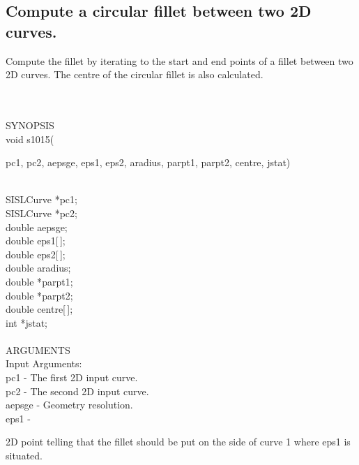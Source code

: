 \subsection{Compute a circular fillet between two 2D curves.}
\begin{minipg1}
  Compute the fillet by iterating to the start and end points of a
  fillet between two 2D curves. The centre of the circular fillet is
  also calculated.
\end{minipg1} \\ \\
SYNOPSIS\\
        \>void s1015(\begin{minipg3}
          {\fov pc1}, {\fov pc2}, {\fov aepsge}, {\fov eps1}, {\fov eps2}, {\fov aradius}, {\fov parpt1}, {\fov parpt2},
          {\fov centre}, {\fov jstat})
        \end{minipg3}\\[0.3ex]
                \>\>    SISLCurve  \>  *{\fov pc1};\\
                \>\>    SISLCurve  \>  *{\fov pc2};\\
                \>\>    double     \>  {\fov aepsge};\\
                \>\>    double     \>  {\fov eps1}[\,];\\
                \>\>    double     \>  {\fov eps2}[\,];\\
                \>\>    double     \>  {\fov aradius};\\
                \>\>    double     \>  *{\fov parpt1};\\
                \>\>    double     \>  *{\fov parpt2};\\
                \>\>    double     \>  {\fov centre}[\,];\\
                \>\>    int        \>  *{\fov jstat};\\
\\
ARGUMENTS\\
        \>Input Arguments:\\
        \>\>    {\fov pc1}     \> - \> The first 2D input curve.\\
        \>\>    {\fov pc2}     \> - \> The second 2D input curve.\\
        \>\>    {\fov aepsge}  \> - \> Geometry resolution.\\
        \>\>    {\fov eps1}    \> - \>
        \begin{minipg2}
          2D point telling that the fillet should be put on
          the side of curve 1 where {\fov eps1} is situated.
        \end{minipg2}\\[0.8ex]
